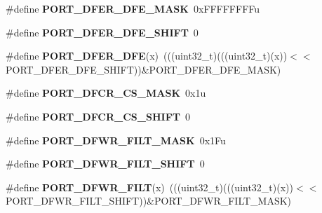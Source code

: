 \begin{DoxyCompactItemize}
\item 
\#define {\bfseries P\+O\+R\+T\+\_\+\+D\+F\+E\+R\+\_\+\+D\+F\+E\+\_\+\+M\+A\+SK}~0x\+F\+F\+F\+F\+F\+F\+F\+Fu\hypertarget{group__PORT__Register__Masks_ga450c760a693b115dc630c8a5edb628df}{}\label{group__PORT__Register__Masks_ga450c760a693b115dc630c8a5edb628df}

\item 
\#define {\bfseries P\+O\+R\+T\+\_\+\+D\+F\+E\+R\+\_\+\+D\+F\+E\+\_\+\+S\+H\+I\+FT}~0\hypertarget{group__PORT__Register__Masks_ga7bcd0509509d5a2865efab49eef02c56}{}\label{group__PORT__Register__Masks_ga7bcd0509509d5a2865efab49eef02c56}

\item 
\#define {\bfseries P\+O\+R\+T\+\_\+\+D\+F\+E\+R\+\_\+\+D\+FE}(x)~(((uint32\+\_\+t)(((uint32\+\_\+t)(x))$<$$<$P\+O\+R\+T\+\_\+\+D\+F\+E\+R\+\_\+\+D\+F\+E\+\_\+\+S\+H\+I\+FT))\&P\+O\+R\+T\+\_\+\+D\+F\+E\+R\+\_\+\+D\+F\+E\+\_\+\+M\+A\+SK)\hypertarget{group__PORT__Register__Masks_ga3261e250c50e71a33b4d443a6ca28c25}{}\label{group__PORT__Register__Masks_ga3261e250c50e71a33b4d443a6ca28c25}

\item 
\#define {\bfseries P\+O\+R\+T\+\_\+\+D\+F\+C\+R\+\_\+\+C\+S\+\_\+\+M\+A\+SK}~0x1u\hypertarget{group__PORT__Register__Masks_gadc66969dfb648b725cd30df406f7a2f9}{}\label{group__PORT__Register__Masks_gadc66969dfb648b725cd30df406f7a2f9}

\item 
\#define {\bfseries P\+O\+R\+T\+\_\+\+D\+F\+C\+R\+\_\+\+C\+S\+\_\+\+S\+H\+I\+FT}~0\hypertarget{group__PORT__Register__Masks_gac739bd97cc0b19198e8daa335c984500}{}\label{group__PORT__Register__Masks_gac739bd97cc0b19198e8daa335c984500}

\item 
\#define {\bfseries P\+O\+R\+T\+\_\+\+D\+F\+W\+R\+\_\+\+F\+I\+L\+T\+\_\+\+M\+A\+SK}~0x1\+Fu\hypertarget{group__PORT__Register__Masks_gaf2f0bbe1dea504156dce840fdcb94b74}{}\label{group__PORT__Register__Masks_gaf2f0bbe1dea504156dce840fdcb94b74}

\item 
\#define {\bfseries P\+O\+R\+T\+\_\+\+D\+F\+W\+R\+\_\+\+F\+I\+L\+T\+\_\+\+S\+H\+I\+FT}~0\hypertarget{group__PORT__Register__Masks_ga9045bd83bc548178d057bf4916c8fe08}{}\label{group__PORT__Register__Masks_ga9045bd83bc548178d057bf4916c8fe08}

\item 
\#define {\bfseries P\+O\+R\+T\+\_\+\+D\+F\+W\+R\+\_\+\+F\+I\+LT}(x)~(((uint32\+\_\+t)(((uint32\+\_\+t)(x))$<$$<$P\+O\+R\+T\+\_\+\+D\+F\+W\+R\+\_\+\+F\+I\+L\+T\+\_\+\+S\+H\+I\+FT))\&P\+O\+R\+T\+\_\+\+D\+F\+W\+R\+\_\+\+F\+I\+L\+T\+\_\+\+M\+A\+SK)\hypertarget{group__PORT__Register__Masks_gad79add2c6df026fd06198143aa198c99}{}\label{group__PORT__Register__Masks_gad79add2c6df026fd06198143aa198c99}


\end{DoxyCompactItemize}
